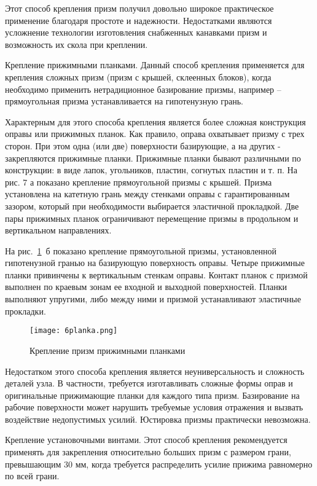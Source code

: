 Этот способ крепления призм получил довольно широкое практическое применение благодаря простоте и надежности. Недостатками являются усложнение технологии изготовления снабженных канавками призм и возможность их скола при креплении.

Крепление прижимными планками. Данный способ крепления применяется для крепления сложных призм (призм с крышей, склеенных блоков), когда необходимо применить нетрадиционное базирование призмы, например -- прямоугольная призма устанавливается на гипотенузную грань.

Характерным для этого способа крепления является более сложная конструкция оправы или прижимных планок. Как правило, оправа охватывает призму с трех сторон. При этом одна (или две) поверхности базирующие, а на других - закрепляются прижимные планки. Прижимные планки бывают различными по конструкции: в виде лапок, угольников, пластин, согнутых пластин и т. п. На рис. 7 а показано крепление прямоугольной призмы с крышей. Призма установлена на катетную грань между стенками оправы с гарантированным зазором, который при необходимости выбирается эластичной прокладкой. Две пары прижимных планок ограничивают перемещение призмы в продольном и вертикальном направлениях.

На рис.~\ref{pic:6planka}~б показано крепление прямоугольной призмы, установленной гипотенузной гранью на базирующую поверхность оправы. Четыре прижимные планки привинчены к вертикальным стенкам оправы. Контакт планок с призмой выполнен по краевым зонам ее входной и выходной поверхностей. Планки выполняют упругими, либо между ними и призмой устанавливают эластичные прокладки.

\begin{figure}[h!]
	\caption{ Крепление призм прижимными планками }
	\texttt{[image: 6planka.png]}
	\label{pic:6planka}
\end{figure}

Недостатком этого способа крепления является неуниверсальность и сложность деталей узла. В частности, требуется изготавливать сложные формы оправ и оригинальные прижимающие планки для каждого типа призм. Базирование на рабочие поверхности может нарушить требуемые условия отражения и вызвать воздействие недопустимых усилий. Юстировка призмы практически невозможна.

Крепление установочными винтами. Этот способ крепления рекомендуется применять для закрепления относительно больших призм с размером грани, превышающим 30 мм, когда требуется распределить усилие прижима равномерно по всей грани.

